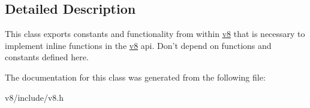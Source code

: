 \subsection{Detailed Description}
This class exports constants and functionality from within \hyperlink{namespacev8}{v8} that is necessary to implement inline functions in the \hyperlink{namespacev8}{v8} api. Don't depend on functions and constants defined here. 

The documentation for this class was generated from the following file\-:\begin{DoxyCompactItemize}
\item 
v8/include/v8.\-h\end{DoxyCompactItemize}

